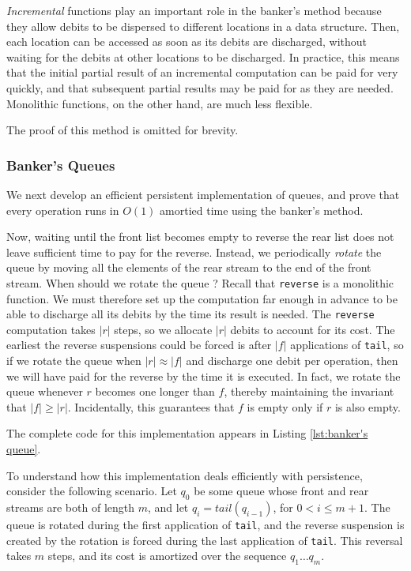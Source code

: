 \documentclass[12pt, a4paper]{article} %
\newcommand{\code}[1]{\texttt{#1}} %
\begin{document}
\textit{Incremental} functions play an important role in the banker's method because they allow debits to be dispersed to different locations in a data structure. Then, each location can be accessed as soon as its debits are discharged, without waiting for the debits at other locations to be discharged. In practice, this means that the initial partial result of an incremental computation can be paid for very quickly, and that subsequent partial results may be paid for as they are needed. Monolithic functions, on the other hand, are much less flexible.

The proof of this method is omitted for brevity.

\subsubsection{Banker's Queues}%
\label{ssub:Banker's Queues}

We next develop an efficient persistent implementation of queues, and prove that every operation runs in $O(1)$ amortied time using the banker's method.

Now, waiting until the front list becomes empty to reverse the rear list does not leave sufficient time to pay for the reverse. Instead, we periodically \textit{rotate} the queue by moving all the elements of the rear stream to the end of the front stream. When should we rotate the queue ? Recall that \code{reverse} is a monolithic function. We must therefore set up the computation far enough in advance to be able to discharge all its debits by the time its result is needed. The \code{reverse} computation takes $|r|$ steps, so we allocate $|r|$ debits to account for its cost. The earliest the reverse suspensions could be forced is after $|f|$ applications of \code{tail}, so if we rotate the queue when $|r| \approx |f|$ and discharge one debit per operation, then we will have paid for the reverse by the time it is executed. In fact, we rotate the queue whenever $r$ becomes one longer than $f$, thereby maintaining the invariant that $|f| \geq |r|$. Incidentally, this guarantees that $f$ is empty only if $r$ is also empty.

The complete code for this implementation appears in Listing \ref{lst:banker's queue}.

To understand how this implementation deals efficiently with persistence, consider the following scenario. Let $q_0$ be some queue whose front and rear streams are both of length $m$, and let $q_i = tail(q_{i-1})$, for $0 < i \leq m + 1$. The queue is rotated during the first application of \code{tail}, and the reverse suspension is created by the rotation is forced during the last application of \code{tail}. This reversal takes $m$ steps, and its cost is amortized over the sequence $q_1 \ldots q_m$.
\end{document}
